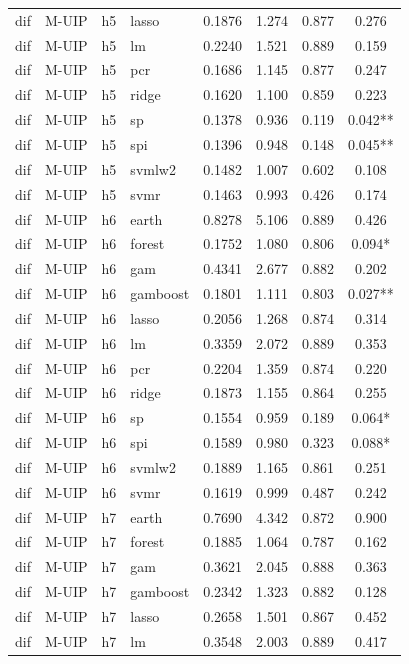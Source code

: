 \begin{ThreePartTable}
\begin{longtable}[t]{llclcccc}
dif & M-UIP & h5 & lasso & 0.1876 & 1.274 & 0.877 & 0.276\\
dif & M-UIP & h5 & lm & 0.2240 & 1.521 & 0.889 & 0.159\\
dif & M-UIP & h5 & pcr & 0.1686 & 1.145 & 0.877 & 0.247\\
dif & M-UIP & h5 & ridge & 0.1620 & 1.100 & 0.859 & 0.223\\
dif & M-UIP & h5 & sp & 0.1378 & 0.936 & 0.119 & 0.042**\\
dif & M-UIP & h5 & spi & 0.1396 & 0.948 & 0.148 & 0.045**\\
dif & M-UIP & h5 & svmlw2 & 0.1482 & 1.007 & 0.602 & 0.108\\
dif & M-UIP & h5 & svmr & 0.1463 & 0.993 & 0.426 & 0.174\\
\addlinespace
dif & M-UIP & h6 & earth & 0.8278 & 5.106 & 0.889 & 0.426\\
dif & M-UIP & h6 & forest & 0.1752 & 1.080 & 0.806 & 0.094*\\
dif & M-UIP & h6 & gam & 0.4341 & 2.677 & 0.882 & 0.202\\
dif & M-UIP & h6 & gamboost & 0.1801 & 1.111 & 0.803 & 0.027**\\
dif & M-UIP & h6 & lasso & 0.2056 & 1.268 & 0.874 & 0.314\\
dif & M-UIP & h6 & lm & 0.3359 & 2.072 & 0.889 & 0.353\\
dif & M-UIP & h6 & pcr & 0.2204 & 1.359 & 0.874 & 0.220\\
dif & M-UIP & h6 & ridge & 0.1873 & 1.155 & 0.864 & 0.255\\
dif & M-UIP & h6 & sp & 0.1554 & 0.959 & 0.189 & 0.064*\\
dif & M-UIP & h6 & spi & 0.1589 & 0.980 & 0.323 & 0.088*\\
dif & M-UIP & h6 & svmlw2 & 0.1889 & 1.165 & 0.861 & 0.251\\
dif & M-UIP & h6 & svmr & 0.1619 & 0.999 & 0.487 & 0.242\\
\addlinespace
dif & M-UIP & h7 & earth & 0.7690 & 4.342 & 0.872 & 0.900\\
dif & M-UIP & h7 & forest & 0.1885 & 1.064 & 0.787 & 0.162\\
dif & M-UIP & h7 & gam & 0.3621 & 2.045 & 0.888 & 0.363\\
dif & M-UIP & h7 & gamboost & 0.2342 & 1.323 & 0.882 & 0.128\\
dif & M-UIP & h7 & lasso & 0.2658 & 1.501 & 0.867 & 0.452\\
dif & M-UIP & h7 & lm & 0.3548 & 2.003 & 0.889 & 0.417\\

\end{longtable}
\end{ThreePartTable}
